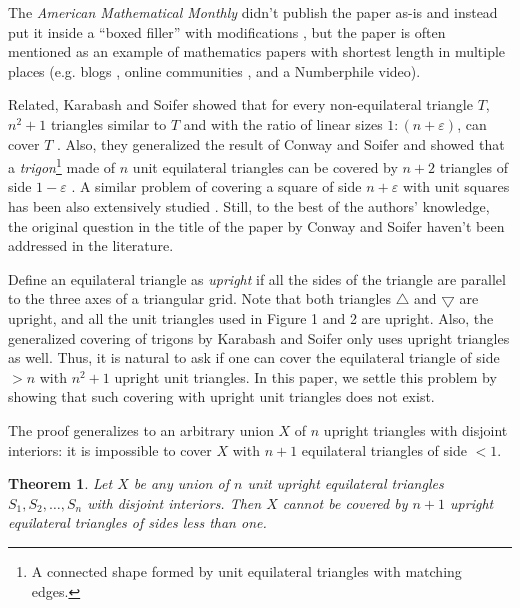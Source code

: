 \documentclass[a4paper]{amsart}
\theoremstyle{plain}
\newtheorem{theorem}{Theorem}
\theoremstyle{definition}
\begin{document}
The \emph{American Mathematical Monthly} didn't publish the paper as-is and instead put it inside a ``boxed filler'' with modifications \cite{conway2005covering},
but the paper is often mentioned as an example of mathematics papers with shortest length in multiple places (e.g. blogs \cite{ShortestKnownPaperPublished, ShortestPapersEver}, online communities \cite{bhuyanWhatShortestPaper2015, creinaldoShortestPaperEver2015, hellon00bShortestKnownPaperPublished2015}, and a Numberphile video).

Related, Karabash and Soifer showed that for every non-equilateral triangle \(T\), \(n^2 + 1\) triangles similar to \(T\) and with the ratio of linear sizes \(1: (n + \varepsilon)\), can cover \(T\) \cite{karabash2005covering}. 
Also, they generalized the result of Conway and Soifer and showed that a \emph{trigon}\footnote{A connected shape formed by unit equilateral triangles with matching edges.} made of \(n\) unit equilateral triangles can be covered by \(n + 2\) triangles of side \(1 - \varepsilon\) \cite{karabash2005covering}.
A similar problem of covering a square of side \(n + \varepsilon\) with unit squares has been also extensively studied \cite{karabash2006sharp, karabash2008note, chung2009packing, wang2016new, chungEfficientPackingsUnit2020}.
Still, to the best of the authors' knowledge, the original question in the title of the paper by Conway and Soifer haven't been addressed in the literature.

Define an equilateral triangle as \emph{upright} if all the sides of the triangle are parallel to the three axes of a triangular grid.
Note that both triangles $\bigtriangleup$ and $\bigtriangledown$ are upright, and all the unit triangles used in Figure 1 and 2 are upright.
Also, the generalized covering of trigons by Karabash and Soifer \cite{karabash2005covering} only uses upright triangles as well.
Thus, it is natural to ask if one can cover the equilateral triangle of side \(> n\) with \(n^2 + 1\) upright unit triangles.
In this paper, we settle this problem by showing that such covering with upright unit triangles does not exist.

The proof generalizes to an arbitrary union \(X\) of \(n\) upright triangles with disjoint interiors: it is impossible to cover \(X\) with \(n + 1\) equilateral triangles of side \(< 1\).

\begin{theorem}

Let \(X\) be any union of \(n\) unit upright equilateral triangles \(S_1, S_2, \dots, S_n\) with disjoint interiors. Then \(X\) cannot be covered by \(n + 1\) upright equilateral triangles of sides less than one.

\label{thm:triangle-cover}
\end{theorem}
\end{document}
